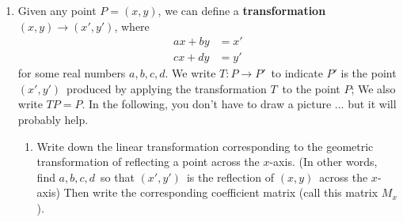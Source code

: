 \documentclass{letter}
\newcommand{\?}{\stackrel{?}{=}}
\newcommand\Que[1]{%
   \leavevmode\noindent
   #1
}
\begin{document}
\begin{enumerate}
    \item Given any point $P=(x,y)$, we can define a  \textbf{transformation} $(x,y) \to (x',y')$, where
    \begin{align*}
      ax+by &= x' \\
      cx+dy &= y'
    \end{align*}
    for some real numbers $a,b,c,d$.  We write $T:P\to P'$\ to indicate $P'$ is the point $(x',y')$\ produced by applying the transformation $T$\ to the point $P$; We also write $TP=P$.  In the following, you don't have to draw a picture ... but it will probably help.
    \begin{enumerate}[label=(\alph*)]
        \item\Que{
          Write down the linear transformation corresponding to the geometric transformation of reflecting a point across the $x$-axis.  (In other words, find $a,b,c,d$\ so that $(x',y')$\ is the reflection of $(x,y)$\ across the $x$-axis)  Then write the corresponding coefficient matrix (call this matrix $M_x$).
           
}
\end{enumerate}
\end{enumerate}
\end{document}
